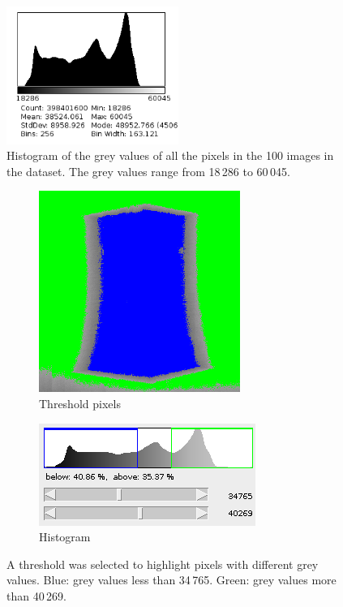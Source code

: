 \documentclass[12pt]{report}
\begin{document}
\begin{figure}
\centering
\includegraphics[width=0.5\textwidth]{figures/block_histogram.png}
\caption{Histogram of the grey values of all the pixels in the 100 images in the dataset. The grey values range from 18\,286 to 60\,045.}
\label{fig:block_histogram}
\end{figure}

\begin{figure}
	\centering
	\begin{subfigure}[b]{0.45\textwidth}
		\includegraphics[width=\textwidth]{figures/block_threshold.png}
		\caption{Threshold pixels}
	\end{subfigure}
	\begin{subfigure}[b]{0.45\textwidth}
		\includegraphics[]{figures/block_threshold_histogram.png}
		\caption{Histogram}	
	\end{subfigure}
	\caption{A threshold was selected to highlight pixels with different grey values. Blue: grey values less than 34\,765. Green: grey values more than 40\,269.}
	\label{fig:block_threshold}
\end{figure}
\end{document}
